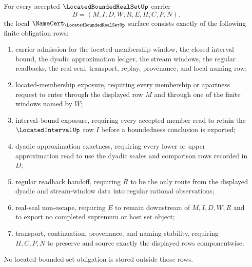 \begin{theorem}
\label{thm:located-bounded-real-set-namecert-obligations}
For every accepted $\LocatedBoundedRealSetUp$ carrier
$$
B=(M,I,D,W,R,E,H,C,P,N),
$$
the local $\NameCert_{\LocatedBoundedRealSetUp}$ surface consists exactly of the following finite obligation rows:
\begin{enumerate}
\item carrier admission for the located-membership window, the closed interval bound, the dyadic approximation ledger, the stream windows, the regular readbacks, the real seal, transport, replay, provenance, and local naming row;
\item located-membership exposure, requiring every membership or apartness request to enter through the displayed row $M$ and through one of the finite windows named by $W$;
\item interval-bound exposure, requiring every accepted member read to retain the $\LocatedIntervalUp$ row $I$ before a boundedness conclusion is exported;
\item dyadic approximation exactness, requiring every lower or upper approximation read to use the dyadic scales and comparison rows recorded in $D$;
\item regular readback handoff, requiring $R$ to be the only route from the displayed dyadic and stream-window data into regular rational observations;
\item real-seal non-escape, requiring $E$ to remain downstream of $M,I,D,W,R$ and to export no completed supremum or host set object;
\item transport, continuation, provenance, and naming stability, requiring $H,C,P,N$ to preserve and source exactly the displayed rows componentwise.
\end{enumerate}
No located-bounded-set obligation is stored outside those rows.
\end{theorem}

